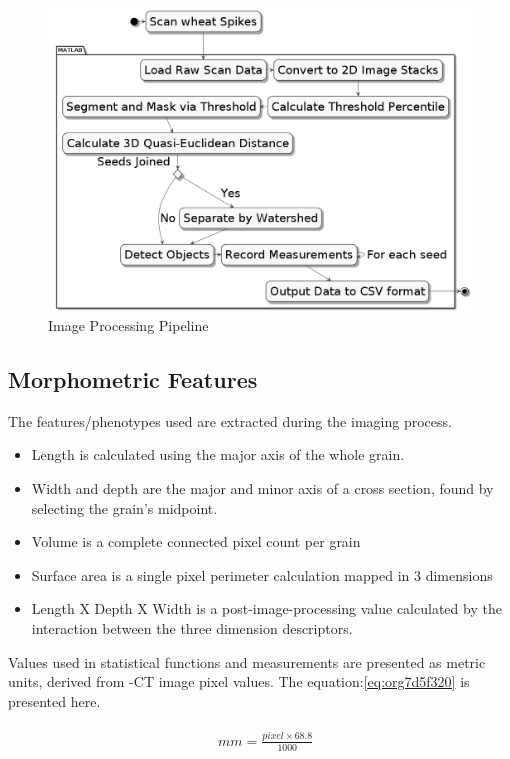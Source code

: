 \documentclass[11pt]{report}
\begin{document}
\begin{figure}[htbp]
\centering
\includegraphics[width=15cm]{./images/matlab.png}
\caption{\label{fig:orgb9b82c8}
Image Processing Pipeline}
\end{figure}

\subsection{Morphometric Features}
\label{sec:orgc249e6d}

The features/phenotypes used are extracted during the imaging process.
\begin{itemize}
\item Length is calculated using the major axis of the whole grain.
\item Width and depth are the major and minor axis of a cross section, found by selecting the grain's midpoint.
\item Volume is a complete connected pixel count per grain
\item Surface area is a single pixel perimeter calculation mapped in 3 dimensions
\item Length X Depth X Width is a post-image-processing value calculated by the interaction between the three dimension descriptors.
\end{itemize}

Values used in statistical functions and measurements are presented as metric units, derived from \textmu{}-CT image pixel values. The equation:\ref{eq:org7d5f320} is presented here.

\begin{align}
\label{eq:org7d5f320}
  &\begin{aligned}
mm = \frac{pixel \times 68.8}{1000}
  \end{aligned}
\end{align}
\end{document}
